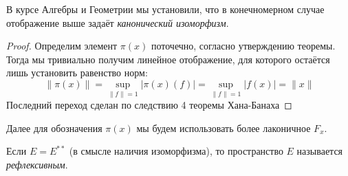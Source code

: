 \begin{anote}
	В курсе Алгебры и Геометрии мы установили, что в конечномерном случае отображение выше задаёт \textit{канонический изоморфизм}.
\end{anote}

\begin{proof}
	Определим элемент $\pi(x)$ поточечно, согласно утверждению теоремы. Тогда мы тривиально получим линейное отображение, для которого остаётся лишь установить равенство норм:
	\[
		\|\pi(x)\| = \sup_{\|f\| = 1} |\pi(x)(f)| = \sup_{\|f\| = 1} |f(x)| = \|x\|
	\]
	Последний переход сделан по следствию 4 теоремы Хана-Банаха
\end{proof}

\begin{note}
	Далее для обозначения $\pi(x)$ мы будем использовать более лаконичное $F_x$.
\end{note}

\begin{definition}
	Если $E = E^{**}$ (в смысле наличия изоморфизма), то пространство $E$ называется \textit{рефлексивным}.
\end{definition}